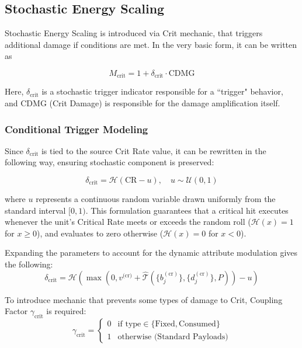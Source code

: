 \documentclass[twocolumn,10pt]{article}
\begin{document}
\subsection{Stochastic Energy Scaling}

Stochastic Energy Scaling is introduced via Crit mechanic, that triggers additional damage if conditions are met. In the very basic form, it can be written as

\begin{equation}
\label{eq:crit_multiplier}
  M_{\text{crit}} = 1 + \delta_{\text{crit}} \cdot \text{CDMG}
\end{equation}

Here, $\delta_{\text{crit}}$ is a stochastic trigger indicator responsible for a ``trigger" behavior, and $\text{CDMG}$ (Crit Damage) is responsible for the damage amplification itself.

\subsubsection{Conditional Trigger Modeling}
Since $\delta_{\text{crit}}$ is tied to the source Crit Rate value, it can be rewritten in the following way, ensuring stochastic component is preserved:

\begin{equation}
\label{eq:crit_stochastic}
  \delta_{\text{crit}} = \mathcal{H}(\text{CR} - u), \quad u \sim \mathcal{U}(0, 1)
\end{equation}

where $u$ represents a continuous random variable drawn uniformly from the standard interval $[0, 1)$. This formulation guarantees that a critical hit executes whenever the unit's Critical Rate meets or exceeds the random roll ($\mathcal{H}(x) = 1$ for $x \ge 0$), and evaluates to zero otherwise ($\mathcal{H}(x) = 0$ for $x < 0$).

Expanding the parameters to account for the dynamic attribute modulation gives the following:
\begin{equation}
  \label{eq:crit_rate_nodmgtype}
\delta_{\text{crit}} = \mathcal{H}\left(\max\left(0,v^{\text{(cr)}}+\hat{\mathcal{T}}\left(\{b^{(\text{cr})}_j\}, \{d^{(\text{cr})}_j\}, P\right)\right) - u\right)
\end{equation}

To introduce mechanic that prevents some types of damage to Crit, Coupling Factor $\gamma_{\text{crit}}$ is required:
\begin{equation}
\label{eq:gamma_crit}
  \gamma_{\text{crit}} = 
  \begin{cases} 
    0 & \text{if } \text{type} \in \{\text{Fixed}, \text{Consumed}\} \\ 
    1 & \text{otherwise (Standard Payloads)} 
  \end{cases}
\end{equation}
\end{document}

